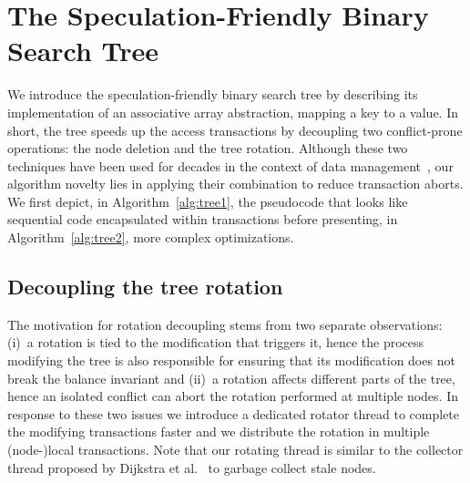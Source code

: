 %




\section{The Speculation-Friendly Binary Search Tree}\label{sec:tf}

We introduce the speculation-friendly binary search tree by describing its implementation of an associative array abstraction, mapping a key to 
a value. In short, the tree speeds up the access transactions by decoupling two conflict-prone operations: the node deletion and the tree rotation. 
Although these two techniques have been used for decades in the context of data management~\cite{DLM78,Moh90}, our algorithm novelty lies in applying 
their combination to reduce transaction aborts. We first depict, in Algorithm~\ref{alg:tree1}, the pseudocode that looks like sequential code encapsulated 
within transactions before presenting, in Algorithm~\ref{alg:tree2}, more complex optimizations.

\subsection{Decoupling the tree rotation}
The motivation for rotation decoupling stems from two separate observations: (i)~a rotation is tied to the modification that triggers it, hence the process 
modifying the tree is also responsible for ensuring that its modification does not break the balance invariant and (ii)~a rotation affects different 
parts of the tree, hence an isolated conflict can abort the rotation performed at multiple nodes.
In response to these two issues we introduce a dedicated rotator thread to complete the modifying transactions faster and we distribute the rotation 
in multiple (node-)local transactions. 
Note that our rotating thread is similar to the collector 
thread proposed by Dijkstra et al.~\cite{DLM78} to garbage collect stale nodes.

